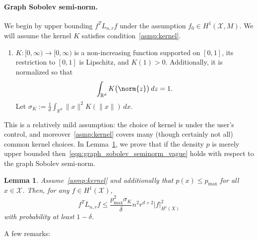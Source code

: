 \documentclass[twoside]{article}
\newcommand{\Reals}{\mathbb{R}}
\newcommand{\1}{\mathbf{1}}
\newcommand{\Rd}{\Reals^d}
\newcommand{\Lap}{L}
\newcommand{\Xset}{\mathcal{X}}
\newtheorem{lemma}{Lemma}
\theoremstyle{definition}
\theoremstyle{remark}
\begin{document}
\paragraph{Graph Sobolev semi-norm.}
We begin by upper bounding $f^T \Lap_{n,r} f$ under the assumption $f_0 \in H^1(\Xset,M)$. We will assume the kernel $K$ satisfies condition~\ref{asmp:kernel}.
\begin{enumerate}[label=(K\arabic*)]
	\item
	\label{asmp:kernel}
	$K:[0,\infty) \to [0,\infty)$ is a non-increasing function supported on $[0,1]$, its restriction to $[0,1]$ is Lipschitz, and $K(1) > 0$. Additionally, it is normalized so that
	\begin{equation*}
	\int_{\Reals^d} K\bigl(\norm{z}\bigr) \,dz = 1.
	\end{equation*}
	Let $\sigma_K := \frac{1}{d} \int_{\Rd} \|x\|^2 K(\|x\|) \,dx$.
\end{enumerate}
This is a relatively mild assumption: the choice of kernel is under the user's control, and moreover~\ref{asmp:kernel} covers many (though certainly not all) common kernel choices. In Lemma~\ref{lem:graph_sobolev_seminorm}, we prove that if the density $p$ is merely upper bounded then~\eqref{eqn:graph_sobolev_seminorm_vague} holds with respect to the graph Sobolev semi-norm.
\begin{lemma}
	\label{lem:graph_sobolev_seminorm}
	Assume~\ref{asmp:kernel} and additionally that $p(x) \leq p_{\max}$ for all $x \in \Xset$. Then, for any $f \in H^1(\Xset)$, 
	\begin{equation}
	\label{eqn:graph_sobolev_seminorm}
	f^T \Lap_{n,r} f \leq \frac{p_{\max}^2 \sigma_K}{\delta} n^2 r^{d + 2} |f|_{H^1(X)}^2
	\end{equation}
	with probability at least $1 - \delta$.
\end{lemma}
A few remarks:
\end{document}
